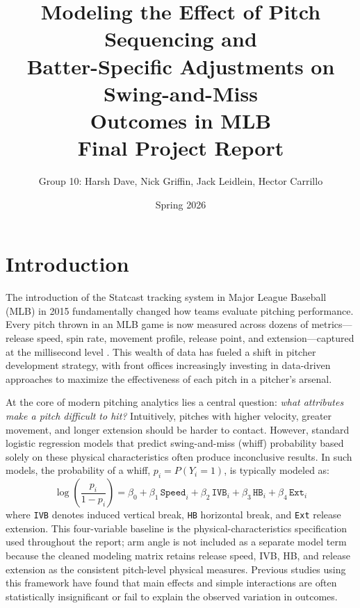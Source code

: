\documentclass[11pt]{article}
\title{\textbf{Modeling the Effect of Pitch Sequencing and\\
Batter-Specific Adjustments on Swing-and-Miss\\
Outcomes in MLB} \\[6pt]
\large Final Project Report}
\author{Group 10: Harsh Dave, Nick Griffin, Jack Leidlein, Hector Carrillo}
\date{Spring 2026}
\begin{document}
\maketitle

\section{Introduction}

The introduction of the Statcast tracking system in Major League Baseball (MLB) in 2015 fundamentally changed how teams evaluate pitching performance.
Every pitch thrown in an MLB game is now measured across dozens of metrics---release speed, spin rate, movement profile, release point, and extension---captured at the millisecond level \citep{statcast2024}.
This wealth of data has fueled a shift in pitcher development strategy, with front offices increasingly investing in data-driven approaches to maximize the effectiveness of each pitch in a pitcher's arsenal.

At the core of modern pitching analytics lies a central question: \textit{what attributes make a pitch difficult to hit?}
Intuitively, pitches with higher velocity, greater movement, and longer extension should be harder to contact.
However, standard logistic regression models that predict swing-and-miss (whiff) probability based solely on these physical characteristics often produce inconclusive results.
In such models, the probability of a whiff, $p_i = P(Y_i = 1)$, is typically modeled as:
%
\begin{equation}\label{eq:baseline}
    \log\!\left(\frac{p_i}{1 - p_i}\right)
    = \beta_0
    + \beta_1 \,\texttt{Speed}_i
    + \beta_2 \,\texttt{IVB}_i
    + \beta_3 \,\texttt{HB}_i
    + \beta_4 \,\texttt{Ext}_i
\end{equation}
%
where \texttt{IVB} denotes induced vertical break, \texttt{HB} horizontal break, and \texttt{Ext} release extension.
This four-variable baseline is the physical-characteristics specification used throughout the report; arm angle is not included as a separate model term because the cleaned modeling matrix retains release speed, IVB, HB, and release extension as the consistent pitch-level physical measures.
Previous studies using this framework have found that main effects and simple interactions are often statistically insignificant or fail to explain the observed variation in outcomes.
\end{document}
